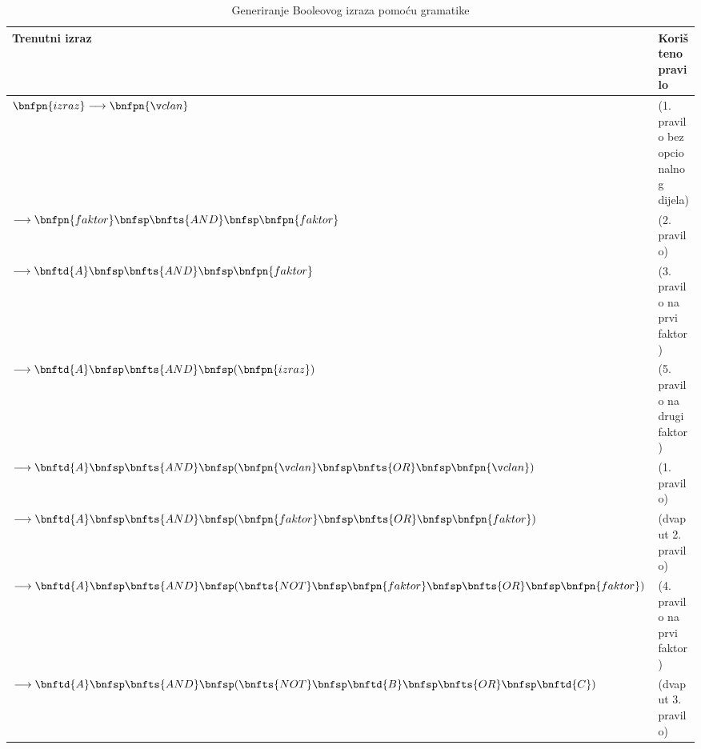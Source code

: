 \documentclass[times, utf8, diplomski]{fer}
\begin{document}
\begin{table}[htb]
	\centering
	\caption{Generiranje Booleovog izraza pomoću gramatike}
	\label{tab:grammar_generate}
	\setlength{\tabcolsep}{20pt}
	\begin{tabular}{|l|l|}
		\hline
		Trenutni izraz & Korišteno pravilo \\
		\hline
		$\bnfpn{izraz} \longrightarrow \bnfpn{član}$ &
		(1. pravilo bez opcionalnog dijela) \\
		$\longrightarrow \bnfpn{faktor} \bnfsp \bnfts{AND} \bnfsp \bnfpn{faktor}$ &
		(2. pravilo) \\
		$\longrightarrow \bnftd{A} \bnfsp \bnfts{AND} \bnfsp \bnfpn{faktor}$ &
		(3. pravilo na prvi faktor) \\
		$\longrightarrow \bnftd{A} \bnfsp \bnfts{AND} \bnfsp ( \bnfpn{izraz} )$ &
		(5. pravilo na drugi faktor) \\
		$\longrightarrow \bnftd{A} \bnfsp \bnfts{AND} \bnfsp ( \bnfpn{član} \bnfsp \bnfts{OR} \bnfsp \bnfpn{član} )$ &
		(1. pravilo) \\
		$\longrightarrow \bnftd{A} \bnfsp \bnfts{AND} \bnfsp ( \bnfpn{faktor} \bnfsp \bnfts{OR} \bnfsp \bnfpn{faktor} )$ &
		(dvaput 2. pravilo) \\
		$\longrightarrow \bnftd{A} \bnfsp \bnfts{AND} \bnfsp ( \bnfts{NOT} \bnfsp \bnfpn{faktor} \bnfsp \bnfts{OR} \bnfsp \bnfpn{faktor} )$ &
		(4. pravilo na prvi faktor) \\
		$\longrightarrow \bnftd{A} \bnfsp \bnfts{AND} \bnfsp ( \bnfts{NOT} \bnfsp \bnftd{B} \bnfsp \bnfts{OR} \bnfsp \bnftd{C} )$ &
		(dvaput 3. pravilo) \\
		\hline
	\end{tabular}
\end{table}
\end{document}

